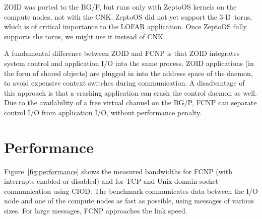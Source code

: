 \documentclass[conference]{worldcomp}
\begin{document}
ZOID was ported to the BG/P, but runs only with ZeptoOS kernels on the
compute nodes, not with the CNK.
ZeptoOS did not yet support the 3-D~torus, which is of critical
importance to the LOFAR application.
Once ZeptoOS fully supports the torus, we might use it instead of CNK.

A fundamental difference between ZOID and FCNP is that ZOID integrates system
control and application I/O into the same process.
ZOID applications (in the form of shared objects) are plugged in into the
address space of the daemon, to avoid expensive context switches during
communication.
A disadvantage of this approach is that a crashing application can crash
the control daemon as well.
Due to the availability of a free virtual channel on the BG/P,
FCNP can separate control I/O from application I/O, without performance penalty.




\section{Performance}
\label{sec:performance}

Figure~\ref{fig:performance} shows the measured bandwidths for FCNP (with
interrupts enabled or disabled) and for TCP and Unix domain socket
communication using CIOD.
The benchmark communicates data between the I/O node and one of the compute
nodes as fast as possible, using messages of various sizes.
For large messages, FCNP approaches the link speed.
\end{document}
